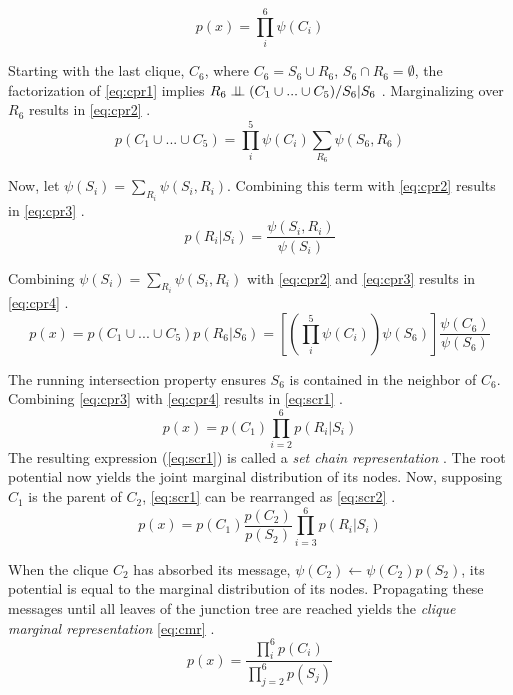 \begin{equation}
  \label{eq:cpr1}
  p(x) = \prod_{i}^{6} \psi(C_{i})
\end{equation}

Starting with the last clique, $C_{6}$, where $C_{6} = S_{6} \cup R_{6}$, $S_{6} \cap R_{6} = \emptyset$, the factorization of \ref{eq:cpr1} implies $R_{6} \perp \!\!\! \perp (C_{1} \cup ... \cup C_{5}) / S_{6} | S_{6}$ \cite{lauritzen1988}.
Marginalizing over $R_{6}$ results in \ref{eq:cpr2} \cite{lauritzen1988}.
%
\begin{equation}
  \label{eq:cpr2}
  p(C_{1} \cup ... \cup C_{5}) = \prod_{i}^{5} \psi(C_{i}) \sum_{R_{6}} \psi(S_{6}, R_{6})
\end{equation}

\noindent Now, let $\psi(S_{i}) = \sum_{R_{i}} \psi(S_{i}, R_{i})$. Combining this term with \ref{eq:cpr2} results in \ref{eq:cpr3} \cite{lauritzen1988}.
%
\begin{equation}
  \label{eq:cpr3}
  p(R_{i} | S_{i}) = \frac{\psi(S_{i}, R_{i})}{\psi(S_{i})}
\end{equation}

\noindent Combining $\psi(S_{i}) = \sum_{R_{i}} \psi(S_{i}, R_{i})$ with \ref{eq:cpr2} and \ref{eq:cpr3} results in \ref{eq:cpr4} \cite{lauritzen1988}.
%
\begin{equation}
  \label{eq:cpr4}
  p(x) = p(C_{1} \cup ... \cup C_{5}) p(R_{6} | S_{6}) = \left[\left(\prod_{i}^{5} \psi(C_{i})\right) \psi(S_{6})\right] \frac{\psi(C_{6})}{\psi(S_{6})}
\end{equation}

\noindent The running intersection property ensures $S_{6}$ is contained in the neighbor of $C_{6}$. Combining \ref{eq:cpr3} with \ref{eq:cpr4} results in \ref{eq:scr1} \cite{lauritzen1988}.
%
\begin{equation}
  \label{eq:scr1}
  p(x) = p(C_{1}) \prod_{i = 2}^{6} p(R_{i} | S_{i})
\end{equation}
\noindent The resulting expression (\ref{eq:scr1}) is called a \textit{set chain representation} \cite{lauritzen1988}.
The root potential now yields the joint marginal distribution of its nodes.
Now, supposing $C_{1}$ is the parent of $C_{2}$, \ref{eq:scr1} can be rearranged as \ref{eq:scr2} \cite{lauritzen1988}.
%
\begin{equation}
  \label{eq:scr2}
  p(x) = p(C_{1}) \frac{p(C_{2})}{p(S_{2})} \prod_{i = 3}^{6} p(R_{i} | S_{i})
\end{equation}

\noindent When the clique $C_{2}$ has absorbed its message, $\psi(C_{2}) \leftarrow \psi(C_{2})p(S_{2})$, its potential is equal to the marginal distribution of its nodes.
Propagating these messages until all leaves of the junction tree are reached yields the \textit{clique marginal representation} \ref{eq:cmr} \cite{lauritzen1988}.
%
\begin{equation}
  \label{eq:cmr}
  p(x) = \frac{\prod_{i}^{6} p(C_{i})}{\prod_{j = 2}^{6} p(S_{j})}
\end{equation}

